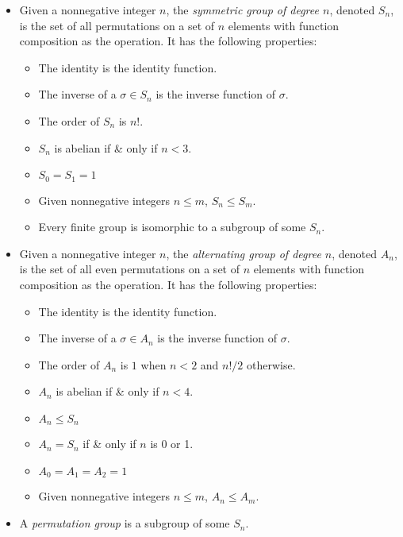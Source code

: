 \documentclass{article}
\begin{document}
\begin{itemize}
\item Given a nonnegative integer $n$, the \emph{symmetric group of degree $n$}, denoted $S_n$, is the set of all permutations on a set of $n$ elements with function composition as the operation.  It has the following properties:
 \begin{itemize}
 \item The identity is the identity function.
 \item The inverse of a $\sigma\in S_n$ is the inverse function of $\sigma$.
 \item The order of $S_n$ is $n!$.
 \item $S_n$ is abelian if \& only if $n<3$.
 \item $S_0 = S_1 = 1$
 \item Given nonnegative integers $n\leq m$, $S_n \leq S_m$.
 \item Every finite group is isomorphic to a subgroup of some $S_n$.
 \end{itemize}
\item Given a nonnegative integer $n$, the \emph{alternating group of degree $n$}, denoted $A_n$, is the set of all even permutations on a set of $n$ elements with function composition as the operation.  It has the following properties:
 \begin{itemize}
 \item The identity is the identity function.
 \item The inverse of a $\sigma\in A_n$ is the inverse function of $\sigma$.
 \item The order of $A_n$ is $1$ when $n<2$ and $n!/2$ otherwise.
 \item $A_n$ is abelian if \& only if $n<4$.
 \item $A_n \leq S_n$
 \item $A_n = S_n$ if \& only if $n$ is 0 or 1.
 \item $A_0 = A_1 = A_2 = 1$
 \item Given nonnegative integers $n\leq m$, $A_n \leq A_m$.
 \end{itemize}
\item A \emph{permutation group} is a subgroup of some $S_n$.


\end{itemize}
\end{document}
